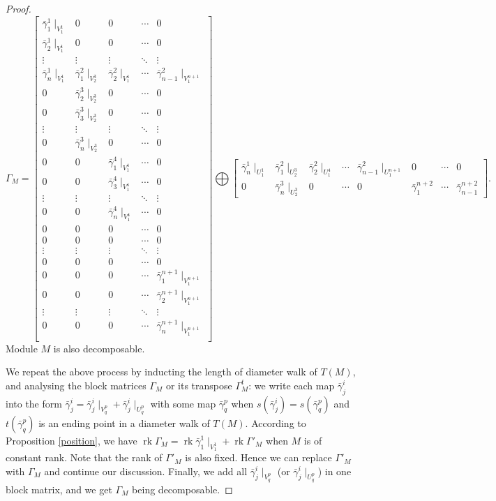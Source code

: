 \documentclass[a4paper,12pt]{amsart}
\newcommand{\bg}{\bar{\gamma}}
\DeclareMathOperator{\rk}{rk}
\begin{document}
\begin{proof}
\begin{equation*}
\Gamma_M=\begin{bmatrix}
\bg^1_1\mid_{V^1_1} & 0  & 0 & \cdots & 0 \\
\bg^1_2\mid_{V^1_1} & 0 & 0& \cdots & 0\\
\vdots &   \vdots & \vdots & \ddots  & \vdots \\
\bg^1_n\mid_{V^1_1} & \bg^2_1\mid_{V^3_2} & \bg^2_2\mid_{V^4_1}& \cdots & \bg^2_{n-1}\mid_{V^{n+1}_1}\\
0 & \bg^3_2\mid_{V^3_2} & 0 & \cdots & 0 \\
0 & \bg^3_3\mid_{V^3_2} & 0 & \cdots & 0 \\
\vdots &   \vdots & \vdots & \ddots  & \vdots \\
0 & \bg^3_n\mid_{V^3_2} & 0 & \cdots & 0 \\
0 & 0 & \bg^4_1\mid_{V^4_1} & \cdots & 0 \\
0 & 0 & \bg^4_3\mid_{V^4_1} & \cdots & 0 \\
\vdots &   \vdots & \vdots & \ddots  & \vdots \\
0 & 0 & \bg^4_n\mid_{V^4_1} & \cdots & 0 \\
0 & 0 & 0 & \cdots & 0 \\
0 & 0 & 0 & \cdots & 0 \\
\vdots &   \vdots & \vdots & \ddots  & \vdots \\
0 & 0 & 0 & \cdots & 0 \\
0 & 0 & 0 & \cdots & \bg^{n+1}_1\mid_{V^{n+1}_1} \\
0 & 0 & 0 & \cdots & \bg^{n+1}_2\mid_{V^{n+1}_1} \\
\vdots &   \vdots & \vdots & \ddots  & \vdots \\
0 & 0 & 0 & \cdots & \bg^{n+1}_n\mid_{V^{n+1}_1} \\
\end{bmatrix} \bigoplus \begin{bmatrix}
\bg^1_n\mid_{U^1_1} & \bg^2_1\mid_{U^3_2} &\bg^2_2\mid_{U^4_1} & \cdots & \bg^2_{n-1}\mid_{U^{n+1}_1} & 0 & \cdots & 0\\
0 & \bg^3_n\mid_{U^3_2} & 0 & \cdots & 0 & \bg^{n+2}_1 & \cdots & \bg^{n+2}_{n-1}
\end{bmatrix}.
\end{equation*}
Module $M$ is also decomposable.



We repeat the above process by inducting the length of diameter  walk of $T(M)$, and analysing  the block matrices $\Gamma_M$ or its transpose $\Gamma^t_M$:  we  write each map $\bg^i_j$ into the form 
 $\bg^i_j=\bg^i_j\mid_{V^p_q}+\bg^i_j\mid_{U^p_q}$ with some map $\bg^p_q$ when $s(\bg^i_j)=s(\bg^p_q)$ and $t(\bg^p_q)$ is an ending point in a diameter walk of $T(M)$. 
 According to Proposition \ref{position}, we have  $\rk \Gamma_M= \rk \bg^1_1\mid_{V^1_1}+\rk \Gamma'_M$ when $M$ is of constant rank. Note that the rank of $\Gamma'_M$ is also fixed.  Hence we can replace $\Gamma'_M$ with $\Gamma_M$ and continue our discussion. Finally, we  add all $\bg^i_j\mid_{V^p_q}$ (or $\bg^i_j\mid_{U^p_q}$) in one block matrix, and we get $\Gamma_M$ being decomposable.
 

\end{proof}
\end{document}
